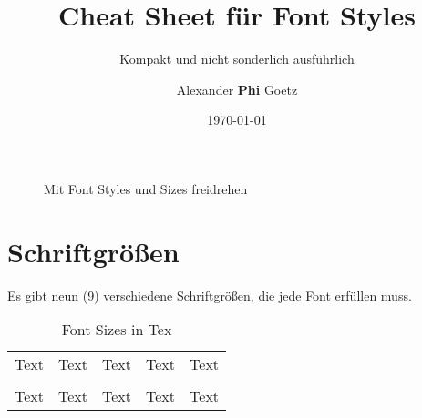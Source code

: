 \documentclass[a4paper]{scrartcl}
\title{Cheat Sheet für Font Styles}
\subtitle{Kompakt und nicht sonderlich ausführlich}
\author{\textsf{Alexander \textbf{Phi} Goetz}}
\date{\today}
\begin{document}
    \maketitle
    
\begin{figure}[h!]
    \centering
    \caption{Mit Font Styles und Sizes freidrehen}
    \label{erpresserbrief}
\end{figure}

\section*{Schriftgrößen}
Es gibt neun (9) verschiedene Schriftgrößen, die jede Font erfüllen muss.

\begin{table}[h!]
    \centering
    \begin{tabular}{c|c|c|c|c}
        \texttt{\tiny}  & \texttt{\scriptsize} 
        & \texttt{\footnotesize} & \texttt{\small} 
        & \texttt{\normalsize} \\
        \hline
        {\tiny Text}             & {\scriptsize Text}
        & {\footnotesize Text}            & {\small Text}
        & {\normalsize Text}            \\
        \hline\hline
        \texttt{\large} & \texttt{\Large} 
        & \texttt{\LARGE}        & \texttt{\huge} 
            & \texttt{\Huge} \\
        \hline
        {\large Text}            & {\Large Text}
        & {\LARGE Text}                   & {\huge Text}            
            & {\Huge Text} 
    \end{tabular}
    \caption{Font Sizes in Tex}
\end{table}
\end{document}

